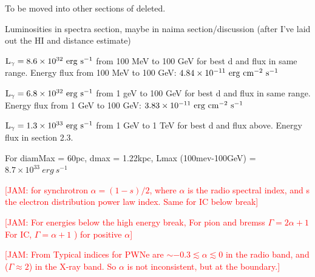 \documentclass[iop]{emulateapj}
\newcommand{\kibitz}[2]{\ifnum\Comments=1\textcolor{#1}{#2}\fi}
\newcommand{\jamie}[1]{\kibitz{red}      {[JAM: #1]}}
\newcommand{\gam}{$\gamma$-ray}
\newcommand{\Gone}{G150.3+4.5}
\begin{document}
To be moved into other sections of deleted.

Luminosities in spectra section, maybe in naima section/discussion (after I've laid out the HI and distance estimate)

${\rm L_{\gamma} = 8.6 \times 10^{32}~erg~s^{-1}}$ from 100 MeV to 100 GeV for best d and flux in same range. Energy flux from 100 MeV to 100 GeV: ${\rm 4.84 \times 10^{-11}~erg~cm^{-2}~s^{-1}} $


${\rm L_{\gamma} = 6.8 \times 10^{32}~erg~s^{-1}}$ from 1 geV to 100 GeV for best d and flux in same range. Energy flux from 1 GeV to 100 GeV: ${\rm 3.83 \times 10^{-11}~erg~cm^{-2}~s^{-1}} $

${\rm L_{\gamma} = 1.3 \times 10^{33}~erg~s^{-1}}$ from 1 GeV to 1 TeV for best d and flux above. Energy flux in section 2.3.

For diamMax = 60pc, dmax = 1.22kpc,  Lmax (100mev-100GeV) = $8.7 \times 10^{33}~erg~s^{-1}$




\jamie{for synchrotron $\alpha = (1-s)/2$, where $\alpha$ is the radio spectral index, and s the electron distribution power law index. Same for IC below break}%



\jamie{For energies below the high energy break, For pion and bremss $\Gamma = 2\alpha + 1$ For IC, $\Gamma = \alpha + 1 $ ) for positive $\alpha$} %

\jamie{From \cite{Gaensler06} Typical indices for PWNe are $\sim -0.3 \lesssim \alpha  \lesssim  0$ in the radio band, and ($\Gamma \approx 2$) in the X-ray band. So $\alpha$ is not inconsistent, but at the boundary.}




%
%


%

\end{document}
